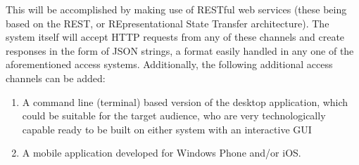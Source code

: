 \documentclass[hidelinks,a4paper,12pt]{article}
\begin{document}
	This will be accomplished by making use of RESTful web services (these being based on the REST, or REpresentational State Transfer architecture). The system itself will accept HTTP requests from any of these channels
	and create responses in the form of JSON strings, a format easily handled in any one of the aforementioned access
	systems.
	Additionally, the following additional access channels can be added:
	\begin{enumerate}
		\item A command line (terminal) based version of the desktop application, which could be suitable for the target
		audience, who are very technologically capable
		ready to be built on either system with an interactive GUI
		\item A mobile application developed for Windows Phone and/or iOS.
	\end{enumerate}
	
\end{document}
